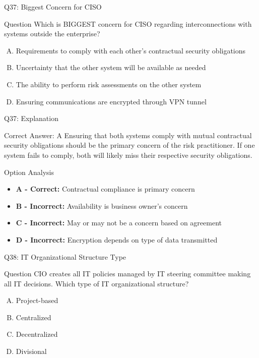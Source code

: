 \documentclass{beamer}
\begin{document}
	\begin{frame}{Q37: Biggest Concern for CISO}
		\begin{block}{Question}
			Which is BIGGEST concern for CISO regarding interconnections with systems outside the enterprise?
		\end{block}
		\begin{enumerate}[(A)]
			\item Requirements to comply with each other's contractual security obligations
			\item Uncertainty that the other system will be available as needed
			\item The ability to perform risk assessments on the other system
			\item Ensuring communications are encrypted through VPN tunnel
		\end{enumerate}
	\end{frame}
	
	\begin{frame}{Q37: Explanation}
		\begin{block}{Correct Answer: A}
			Ensuring that both systems comply with mutual contractual security obligations should be the primary concern of the risk practitioner. If one system fails to comply, both will likely miss their respective security obligations.
		\end{block}
		\begin{block}{Option Analysis}
			\begin{itemize}
				\item \textbf{A - Correct:} Contractual compliance is primary concern
				\item \textbf{B - Incorrect:} Availability is business owner's concern
				\item \textbf{C - Incorrect:} May or may not be a concern based on agreement
				\item \textbf{D - Incorrect:} Encryption depends on type of data transmitted
			\end{itemize}
		\end{block}
	\end{frame}
	
	\begin{frame}{Q38: IT Organizational Structure Type}
		\begin{block}{Question}
			CIO creates all IT policies managed by IT steering committee making all IT decisions. Which type of IT organizational structure?
		\end{block}
		\begin{enumerate}[(A)]
			\item Project-based
			\item Centralized
			\item Decentralized
			\item Divisional
		\end{enumerate}
	\end{frame}
	
\end{document}
